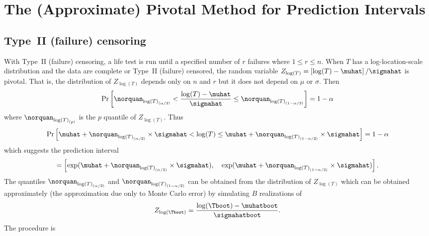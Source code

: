\section{The (Approximate) Pivotal Method for Prediction Intervals}
\label{section:pivot.pred.method}
\subsection{Type~II (failure) censoring}
\label{section:tyep2.pivot.pred.method}
With Type~II (failure) censoring, a life test is run until a
specified number of $r$ failures where $1 \leq r \leq n$.  When $T$
has a log-location-scale distribution and the data are complete or
Type~II (failure) censored, the random variable $Z_{\log(T)}=\left [
\log(T)-\muhat \right ]/\sigmahat$ is pivotal. That is, the
distribution of $Z_{\log(T)}$ depends only on $n$ and $r$
but it does not depend on $\mu$ or
$\sigma$. Then
\begin{displaymath}
\Pr \left[ \norquan_{{\log(T)}_{(\alpha/2)}} < 
\frac{\log(T)-\muhat}{\sigmahat}
\leq \norquan_{{\log(T)}_{(1-\alpha/2)}} \right] 
= 1-\alpha
\end{displaymath}
where $\norquan_{{\log(T)}_{(p)}}$ is the $p$ quantile of
$Z_{\log(T)}$. Thus
\begin{displaymath}
\Pr \left[ \muhat + \norquan_{{\log(T)}_{(\alpha/2)}} \times \sigmahat < 
\log(T)
\leq \muhat + \norquan_{{\log(T)}_{(1-\alpha/2)}} \times \sigmahat \right] = 1-\alpha
\end{displaymath}
which suggests the prediction interval
\begin{displaymath}
[ \Tlower, \quad \Tupper ] = 
\left 	[ \exp(\muhat + \norquan_{{\log(T)}_{(\alpha/2)}} \times \sigmahat),
\quad \exp(\muhat + \norquan_{{\log(T)}_{(1-\alpha/2)}} \times \sigmahat)
\right  ].
\end{displaymath}
The quantiles $\norquan_{{\log(T)}_{(\alpha/2)}}$ and
$\norquan_{{\log(T)}_{(1-\alpha/2)}}$ can be obtained from the
distribution of $Z_{\log(T)}$ which can be obtained approximately
(the approximation due only to Monte Carlo error) by simulating $B$
realizations of
\begin{equation}
\label{equation:z.pivot}
Z_{\log(\Tboot)}= \frac{\log(\Tboot)-\muhatboot}{\sigmahatboot}.
\end{equation}
The procedure is
